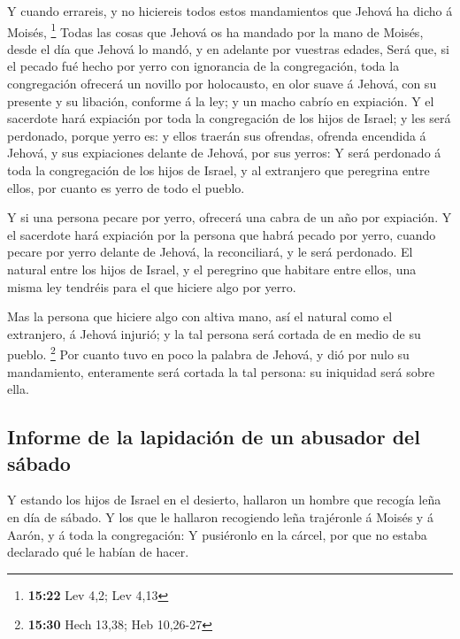  Y cuando errareis, y no hiciereis todos estos
mandamientos que Jehová ha dicho á Moisés, \footnote{\textbf{15:22} Lev
  4,2; Lev 4,13}  Todas las cosas que Jehová os ha
mandado por la mano de Moisés, desde el día que Jehová lo mandó, y en
adelante por vuestras edades,  Será que, si el pecado fué
hecho por yerro con ignorancia de la congregación, toda la congregación
ofrecerá un novillo por holocausto, en olor suave á Jehová, con su
presente y su libación, conforme á la ley; y un macho cabrío en
expiación.  Y el sacerdote hará expiación por toda la
congregación de los hijos de Israel; y les será perdonado, porque yerro
es: y ellos traerán sus ofrendas, ofrenda encendida á Jehová, y sus
expiaciones delante de Jehová, por sus yerros:  Y será
perdonado á toda la congregación de los hijos de Israel, y al extranjero
que peregrina entre ellos, por cuanto es yerro de todo el pueblo.

 Y si una persona pecare por yerro, ofrecerá una cabra de
un año por expiación.  Y el sacerdote hará expiación por
la persona que habrá pecado por yerro, cuando pecare por yerro delante
de Jehová, la reconciliará, y le será perdonado.  El
natural entre los hijos de Israel, y el peregrino que habitare entre
ellos, una misma ley tendréis para el que hiciere algo por yerro.

 Mas la persona que hiciere algo con altiva mano, así el
natural como el extranjero, á Jehová injurió; y la tal persona será
cortada de en medio de su pueblo. \footnote{\textbf{15:30} Hech 13,38;
  Heb 10,26-27}  Por cuanto tuvo en poco la palabra de
Jehová, y dió por nulo su mandamiento, enteramente será cortada la tal
persona: su iniquidad será sobre ella.

\hypertarget{informe-de-la-lapidaciuxf3n-de-un-abusador-del-suxe1bado}{%
\subsection{Informe de la lapidación de un abusador del
sábado}\label{informe-de-la-lapidaciuxf3n-de-un-abusador-del-suxe1bado}}

 Y estando los hijos de Israel en el desierto, hallaron
un hombre que recogía leña en día de sábado.  Y los que
le hallaron recogiendo leña trajéronle á Moisés y á Aarón, y á toda la
congregación:  Y pusiéronlo en la cárcel, por que no
estaba declarado qué le habían de hacer.

